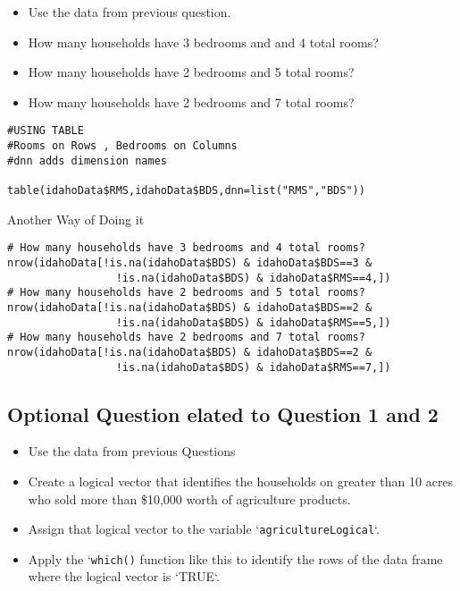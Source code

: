 \documentclass[]{article}
\begin{document}
\begin{itemize}
\item Use the data from previous question. 
\item How many households have 3 bedrooms and and 4 total rooms? 
\item How many households have 2 bedrooms and 5 total rooms? 
\item How many households have 2 bedrooms and 7 total rooms?
\end{itemize}
\begin{framed}
\begin{verbatim}
#USING TABLE
#Rooms on Rows , Bedrooms on Columns
#dnn adds dimension names

table(idahoData$RMS,idahoData$BDS,dnn=list("RMS","BDS"))

\end{verbatim}
\end{framed}
Another Way of Doing it
\begin{framed}
\begin{verbatim}
# How many households have 3 bedrooms and 4 total rooms?
nrow(idahoData[!is.na(idahoData$BDS) & idahoData$BDS==3 &
                 !is.na(idahoData$BDS) & idahoData$RMS==4,])
# How many households have 2 bedrooms and 5 total rooms?
nrow(idahoData[!is.na(idahoData$BDS) & idahoData$BDS==2 &
                 !is.na(idahoData$BDS) & idahoData$RMS==5,])
# How many households have 2 bedrooms and 7 total rooms?
nrow(idahoData[!is.na(idahoData$BDS) & idahoData$BDS==2 &
                 !is.na(idahoData$BDS) & idahoData$RMS==7,])

\end{verbatim}
\end{framed}


\newpage
\subsection*{Optional Question elated to Question 1 and 2}
\begin{itemize}
\item Use the data from previous Questions 
\item Create a logical vector that identifies the households on greater than 10 acres who sold more than \$10,000 worth of agriculture products. 
\item Assign that logical vector to the variable `\texttt{agricultureLogical}`. 
\item Apply the `\texttt{which()} function like this to identify the rows of the data frame where the logical vector is `TRUE`.
\end{itemize}
\end{document}
